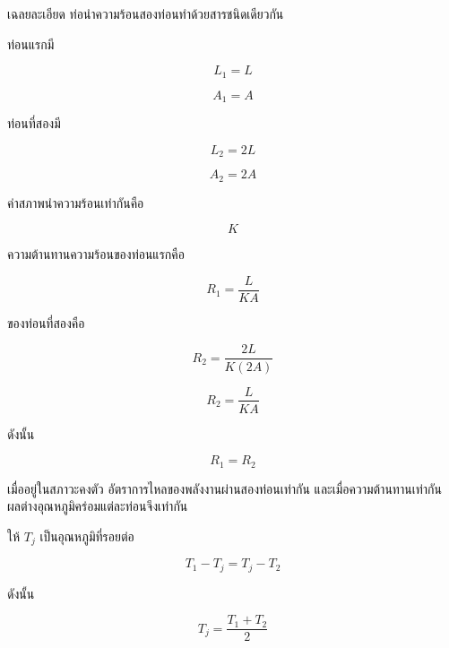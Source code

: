 \begin{examplebox}{เฉลยละเอียด}
ท่อนำความร้อนสองท่อนทำด้วยสารชนิดเดียวกัน

ท่อนแรกมี

\[
L_1=L
\]

\[
A_1=A
\]

ท่อนที่สองมี

\[
L_2=2L
\]

\[
A_2=2A
\]

ค่าสภาพนำความร้อนเท่ากันคือ

\[
K
\]

ความต้านทานความร้อนของท่อนแรกคือ

\[
R_1=\frac{L}{KA}
\]

ของท่อนที่สองคือ

\[
R_2=\frac{2L}{K(2A)}
\]

\[
R_2=\frac{L}{KA}
\]

ดังนั้น

\[
R_1=R_2
\]

เมื่ออยู่ในสภาวะคงตัว อัตราการไหลของพลังงานผ่านสองท่อนเท่ากัน และเมื่อความต้านทานเท่ากัน ผลต่างอุณหภูมิคร่อมแต่ละท่อนจึงเท่ากัน

ให้ $T_j$ เป็นอุณหภูมิที่รอยต่อ

\[
T_1-T_j=T_j-T_2
\]

ดังนั้น

\[
\boxed{
T_j=\frac{T_1+T_2}{2}
}
\]
\end{examplebox}
